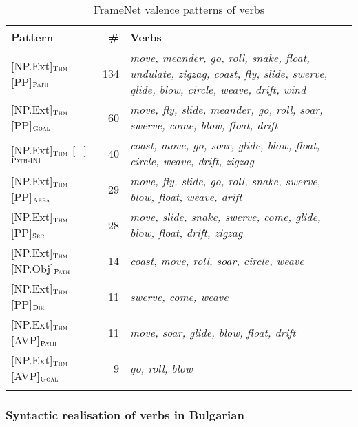 \documentclass[output=paper,colorlinks,citecolor=brown]{langscibook}
\begin{document}
\begin{table}
   \begin{tabularx}{\textwidth}{lrQ} 
   \lsptoprule
   Pattern & \# & Verbs \\ \midrule\relax
{[NP.Ext]}$_{\text{\textsc{Thm}}}$ {[PP]}$_{\text{\textsc{Path}}}$  & 134 & \textit{move, meander, go, roll, snake, float, undulate, zigzag, coast, fly, slide, swerve, glide, blow, circle, weave, drift, wind} \\ \relax
{[NP.Ext]}$_{\text{\textsc{Thm}}}$ {[PP]}$_{\text{\textsc{Goal}}}$  & 60 & \textit{move, fly, slide, meander, go, roll, soar, swerve, come, blow, float, drift}\\ 
{[NP.Ext]}$_{\text{\textsc{Thm}}}$ {[\_]}$_{\text{\textsc{Path-INI}}}$  & 40 & \textit{coast, move, go, soar, glide, blow, float, circle, weave, drift, zigzag}\\ 
{[NP.Ext]}$_{\text{\textsc{Thm}}}$ {[PP]}$_{\text{\textsc{Area}}}$  & 29 & \textit{move, fly, slide, go, roll, snake, swerve, blow, float, weave, drift}\\ 
{[NP.Ext]}$_{\text{\textsc{Thm}}}$ {[PP]}$_{\text{\textsc{Src}}}$  & 28 & \textit{move, slide, snake, swerve, come, glide, blow, float, drift, zigzag}\\ 
{[NP.Ext]}$_{\text{\textsc{Thm}}}$ {[NP.Obj]}$_{\text{\textsc{Path}}}$  & 14 & \textit{coast, move, roll, soar, circle, weave}\\ 
{[NP.Ext]}$_{\text{\textsc{Thm}}}$ {[PP]}$_{\text{\textsc{Dir}}}$  & 11 & \textit{swerve, come, weave}\\ 
{[NP.Ext]}$_{\text{\textsc{Thm}}}$ {[AVP]}$_{\text{\textsc{Path}}}$  & 11 & \textit{move, soar, glide, blow, float, drift}\\ 
{[NP.Ext]}$_{\text{\textsc{Thm}}}$ {[AVP]}$_{\text{\textsc{Goal}}}$  & 9 & \textit{go, roll, blow}\\ 
\lspbottomrule
\end{tabularx}
    \caption{FrameNet valence patterns of  verbs}
    \label{tab:4:motion-valence-framenet}
\end{table} 

\subsubsection{Syntactic realisation of  verbs in Bulgarian}
\end{document}
